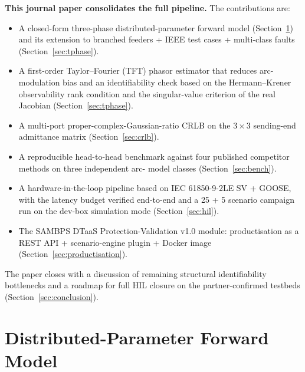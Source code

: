 \documentclass[journal]{IEEEtran}
\begin{document}
\textbf{This journal paper consolidates the full pipeline.}  The
contributions are:
\begin{itemize}
\item A closed-form three-phase distributed-parameter forward
      model (Section~\ref{sec:dp}) and its extension to branched
      feeders + IEEE test cases + multi-class faults
      (Section~\ref{sec:tphase}).
\item A first-order Taylor--Fourier (TFT) phasor estimator that
      reduces arc-modulation bias and an identifiability check
      based on the Hermann--Krener observability rank condition
      and the singular-value criterion of the real Jacobian
      (Section~\ref{sec:tphase}).
\item A multi-port proper-complex-Gaussian-ratio CRLB on the
      $3 \times 3$ sending-end admittance matrix
      (Section~\ref{sec:crlb}).
\item A reproducible head-to-head benchmark against four
      published competitor methods on three independent arc-
      model classes (Section~\ref{sec:bench}).
\item A hardware-in-the-loop pipeline based on IEC 61850-9-2LE
      SV + GOOSE, with the latency budget verified end-to-end
      and a 25 + 5 scenario campaign run on the dev-box
      simulation mode (Section~\ref{sec:hil}).
\item The SAMBPS DTaaS Protection-Validation v1.0 module:
      productisation as a REST API + scenario-engine plugin +
      Docker image (Section~\ref{sec:productisation}).
\end{itemize}

The paper closes with a discussion of remaining structural
identifiability bottlenecks and a roadmap for full HIL closure
on the partner-confirmed testbeds (Section~\ref{sec:conclusion}).

\section{Distributed-Parameter Forward Model}\label{sec:dp}
\end{document}
